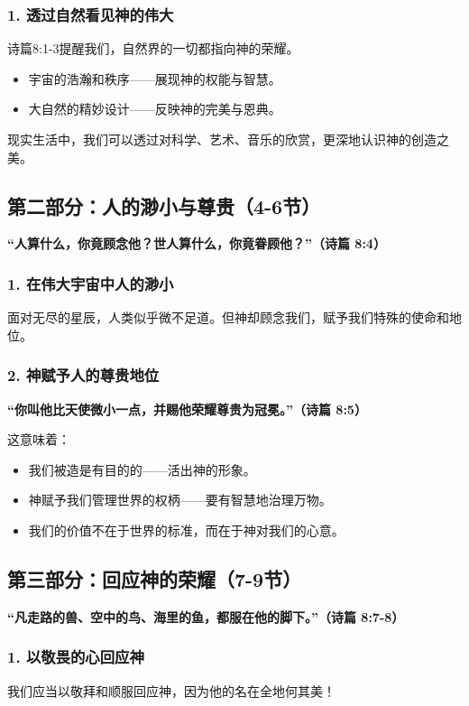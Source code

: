 \documentclass[a4paper, 12pt]{article}
\begin{document}
\subsubsection*{1. 透过自然看见神的伟大}
诗篇8:1-3提醒我们，自然界的一切都指向神的荣耀。
\begin{itemize}
    \item 宇宙的浩瀚和秩序——展现神的权能与智慧。
    \item 大自然的精妙设计——反映神的完美与恩典。
\end{itemize}

现实生活中，我们可以透过对科学、艺术、音乐的欣赏，更深地认识神的创造之美。

\subsection*{第二部分：人的渺小与尊贵（4-6节）}

\textbf{“人算什么，你竟顾念他？世人算什么，你竟眷顾他？”（诗篇 8:4）}

\subsubsection*{1. 在伟大宇宙中人的渺小}
面对无尽的星辰，人类似乎微不足道。但神却顾念我们，赋予我们特殊的使命和地位。

\subsubsection*{2. 神赋予人的尊贵地位}
\textbf{“你叫他比天使微小一点，并赐他荣耀尊贵为冠冕。”（诗篇 8:5）}

这意味着：
\begin{itemize}
    \item 我们被造是有目的的——活出神的形象。
    \item 神赋予我们管理世界的权柄——要有智慧地治理万物。
    \item 我们的价值不在于世界的标准，而在于神对我们的心意。
\end{itemize}

\subsection*{第三部分：回应神的荣耀（7-9节）}

\textbf{“凡走路的兽、空中的鸟、海里的鱼，都服在他的脚下。”（诗篇 8:7-8）}

\subsubsection*{1. 以敬畏的心回应神}
我们应当以敬拜和顺服回应神，因为他的名在全地何其美！
\end{document}
